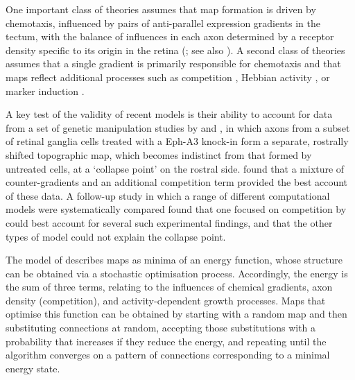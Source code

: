 \documentclass[9pt,lineno,draft]{elife}
\begin{document}
One important class of theories assumes that map formation is driven by chemotaxis, influenced by pairs of anti-parallel expression gradients in the tectum, with the balance of influences in each axon determined by a receptor density specific to its origin in the retina (\citealp{Gierer1983,Gierer1987,Simpson2011}; see also \citealp{Karbowski2004,James2020}). A second class of theories assumes that a single gradient is primarily responsible for chemotaxis and that maps reflect additional processes such as competition \citep{Triplett2011}, Hebbian activity \citep{Tsigankov2006,Tsigankov2010}, or marker induction \citep{Prestige1975,Willshaw2006}.

A key test of the validity of recent models is their ability to account for data from a set of genetic manipulation studies by \cite{brown_topographic_2000} and \cite{reber_relative_2004}, in which axons from a subset of retinal ganglia cells treated with a Eph-A3 knock-in form a separate, rostrally shifted topographic map, which becomes indistinct from that formed by untreated cells, at a ‘collapse point’ on the rostral side. \cite{Sterratt2013} found that a mixture of counter-gradients and an additional competition term provided the best account of these data. A follow-up study in which a range of different computational models were systematically compared \citep{hjorth_quantitative_2015} found that one focused on competition
by \cite{Triplett2011} could best account for several such experimental findings, and that the other types of model could not explain the collapse point.

The model of \cite{Triplett2011} describes maps as minima of an energy function, whose structure can be obtained via a stochastic optimisation process. Accordingly, the energy is the sum of three terms, relating to the influences of chemical gradients, axon density (competition), and activity-dependent growth processes. Maps that optimise this function can be obtained by starting with a random map and then substituting connections at random, accepting those substitutions with a probability that increases if they reduce the energy, and repeating until the algorithm converges on a pattern of connections corresponding to a minimal energy state.
\end{document}
